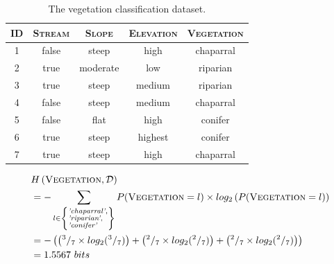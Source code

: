 \documentclass[xcolor={table}]{beamer}
\newcommand{\featN}[1]{\textsc{#1}}
\newcommand{\featL}[1]{\textit{'#1'}}
\begin{document}
 \begin{frame} 
\begin{table}[h]
\caption{The vegetation classification dataset.}
\label{tab:ecologydata}
\centering
\begin{footnotesize}
\begin{tabular}{c c c c c }
\hline
\featN{ID}	 & \featN{Stream}	& \featN{Slope} & \featN{Elevation} & \featN{Vegetation}\\
\hline
1 & false & steep & high & chaparral\\
2 & true & moderate & low & riparian\\
3 & true & steep & medium & riparian\\
4 & false & steep & medium & chaparral\\
5 & false & flat & high & conifer\\
6 & true & steep & highest & conifer\\
7 & true & steep & high & chaparral\\
\hline
\end{tabular}
\end{footnotesize}
\end{table}
\end{frame} 



 \begin{frame} 
 \begin{footnotesize}
\begin{equation*}
\begin{alignedat}{2}
&H\left(\featN{Vegetation},\mathcal{D}\right)\\
&= - \sum_{l \in  \left\{ \begin{subarray}{1} \featL{chaparral}, \\ \featL{riparian}, \\ \featL{conifer} \end{subarray} \right\}} P(\featN{Vegetation}=l) \times log_2\left(P(\featN{Vegetation}=l)\right)\\
		&= -\left( \left( ^3/_7 \times log_2( ^3/_7) \right) + \left( ^2/_7  \times log_2(^2/_7)\right) + \left( ^2/_7  \times log_2(^2/_7)\right) \right)\\
		&= 1.5567~bits
	\end{alignedat}
	\label{eq:ent-hw-ds}
\end{equation*}
\end{footnotesize}

\end{frame} 
\end{document}
